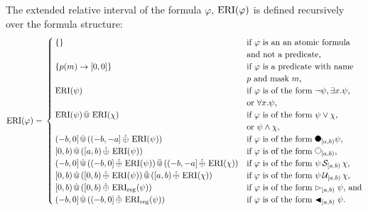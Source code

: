 \begin{definition}
    \label{def:e-rel-int}
    The extended relative interval of the formula $\varphi$, $\operatorname{ERI}(\varphi)$ is defined recursively over the formula structure:
    \begin{equation*}
        \ERI(\varphi) = \\
        \begin{cases}
            \{\} 
                & \text{if $\varphi$ is an an atomic formula} \\ &\text{and not a predicate,} \\ 
            \{p(m) \rightarrow [0,0]\} 
                & \text{if $\varphi$ is a predicate with name } \\ &\text{$p$ and mask $m$,} \\
            \ERI(\psi) 
                & \text{if $\varphi$ is of the form $\neg \psi, \exists x.\psi$,} \\
                & \text{or $\forall x.\psi$,} \\
            \ERI(\psi) \Cupmerge \ERI(\chi) 
                & \text{if $\varphi$ is of the form $\psi \lor \chi$,} \\ & \text{or $\psi \land \chi$,} \\
            (-b,0] \Cupext ((-b,-a] \oplusext \ERI(\psi)) 
                & \text{if $\varphi$ is of the form $\Previous{[a,b)}\psi$,} \\
            [0,b) \Cupext ([a,b) \oplusext \ERI(\psi)) 
                & \text{if $\varphi$ is of the form $\Next{[a,b)}$,}\\
            (-b,0] \Cupext ((-b,0] \oplusext \ERI(\psi)) \Cupmerge ((-b,-a] \oplusext \ERI(\chi)) 
                & \text{if $\varphi$ is of the form $\psi \Since{[a,b)} \chi$,} \\
            [0,b) \Cupext ([0,b) \oplusext \ERI(\psi)) \Cupmerge ([a,b) \oplusext \ERI(\chi)) 
                & \text{if $\varphi$ is of the form $\psi \Until{[a,b)} \chi$,} \\
            [0,b) \Cupext ([0,b) \oplusext \ERIr(\psi)) 
                & \text{if $\varphi$ is of the form $\Fregex{[a,b)} \psi$, and}\\
            (-b,0] \Cupext ((-b,0] \oplusext \ERIr(\psi)) 
                & \text{if $\varphi$ is of the form $\Pregex{[a,b)} \psi$.}\\
        \end{cases}
    \end{equation*}
\end{definition}

